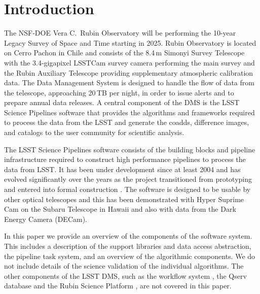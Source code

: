\section{Introduction}
\label{sec:intro}

The NSF-DOE Vera C.\ Rubin Observatory will be performing the 10-year Legacy Survey of Space and Time \citep[LSST;][]{2019ApJ...873..111I} starting in 2025.
Rubin Observatory is located on Cerro Pachon in Chile and consists of the 8.4\,m Simonyi Survey Telescope with the 3.4-gigapixel LSSTCam survey camera performing the main survey and the Rubin Auxiliary Telescope providing supplementary atmospheric calibration data.
The Data Management System \citep[DMS;][]{2022arXiv221113611O} is designed to handle the flow of data from the telescope, approaching 20\,TB per night, in order to issue alerts and to prepare annual data releases.
A central component of the DMS is the LSST Science Pipelines software that provides the algorithms and frameworks required to process the data from the LSST and generate the coadds, difference images, and catalogs to the user community for scientific analysis.

The LSST Science Pipelines software consists of the building blocks and pipeline infrastructure required to construct high performance pipelines to process the data from LSST.
It has been under development since at least 2004 \citep{2004AAS...20510811A} and has evolved significantly over the years as the project transitioned from prototyping \citep{2010SPIE.7740E..15A} and entered into formal construction \citep{2017ASPC..512..279J}.
The software is designed to be usable by other optical telescopes and this has been demonstrated with Hyper Suprime Cam on the Subaru Telescope in Hawaii \citep{2018PASJ...70S...5B} and also with data from the Dark Energy Camera (DECam).

In this paper we provide an overview of the components of the software system.
This includes a description of the support libraries and data access abstraction, the pipeline task system, and an overview of the algorithmic components.
We do not include details of the science validation of the individual algorithms.
The other components of the LSST DMS, such as the workflow system \citep{2022arXiv221115795G}, the Qserv database \citep{Wang:2011:QDS:2063348.2063364} and the Rubin Science Platform \citep{LSE-319}, are not covered in this paper.
